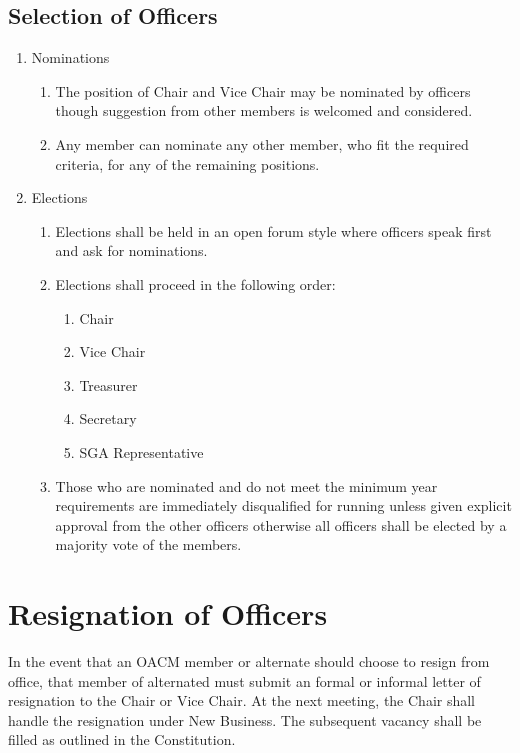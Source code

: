 \documentclass[letterpaper, 12pt]{article}
\begin{document}
\subsection{Selection of Officers}
\begin{enumerate}
    \item Nominations
        \begin{enumerate}
            \item The position of Chair and Vice Chair may be nominated by 
                officers though suggestion from other members is welcomed 
                and considered.
            \item Any member can nominate any other member, who fit the 
                required criteria, for any of the remaining positions.
        \end{enumerate}
    \item Elections
        \begin{enumerate}
            \item Elections shall be held in an open forum style where 
                officers speak first and ask for nominations.
            \item Elections shall proceed in the following order:
                \begin{enumerate}
                    \item Chair
                    \item Vice Chair
                    \item Treasurer
                    \item Secretary
                    \item SGA Representative
                \end{enumerate}
            \item Those who are nominated and do not meet the minimum year 
                requirements are immediately disqualified for running unless 
                given explicit approval from the other officers otherwise 
                all officers shall be elected by a majority vote of the 
                members.
        \end{enumerate}
\end{enumerate}
\section{Resignation of Officers}
In the event that an OACM member or alternate should choose to resign from 
office, that member of alternated must submit an formal or informal letter 
of resignation to the Chair or Vice Chair.  
At the next meeting, the Chair shall handle the resignation under New 
Business.  
The subsequent vacancy shall be filled as outlined in the Constitution. 
\end{document}

